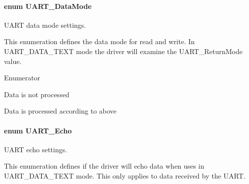 \paragraph[{U\+A\+R\+T\+\_\+\+Data\+Mode}]{\setlength{\rightskip}{0pt plus 5cm}enum {\bf U\+A\+R\+T\+\_\+\+Data\+Mode}}\label{_u_a_r_t_8h_a694090fdb166f94ac30b809f9cba87b8}


U\+A\+R\+T data mode settings. 

This enumeration defines the data mode for read and write. In U\+A\+R\+T\+\_\+\+D\+A\+T\+A\+\_\+\+T\+E\+X\+T mode the driver will examine the U\+A\+R\+T\+\_\+\+Return\+Mode value. \begin{Desc}
\item[Enumerator]\par
\begin{description}
\item[{\em 
U\+A\+R\+T\+\_\+\+D\+A\+T\+A\+\_\+\+B\+I\+N\+A\+R\+Y\label{_u_a_r_t_8h_a694090fdb166f94ac30b809f9cba87b8aaa8edcbf6c236b0d86491ea1e7c9e4d8}
}]Data is not processed \item[{\em 
U\+A\+R\+T\+\_\+\+D\+A\+T\+A\+\_\+\+T\+E\+X\+T\label{_u_a_r_t_8h_a694090fdb166f94ac30b809f9cba87b8a87fdfb7ca981eab7f56c51380fd7094e}
}]Data is processed according to above \end{description}
\end{Desc}
\paragraph[{U\+A\+R\+T\+\_\+\+Echo}]{\setlength{\rightskip}{0pt plus 5cm}enum {\bf U\+A\+R\+T\+\_\+\+Echo}}\label{_u_a_r_t_8h_aac6a03c2e1d76f53e1d9d923dcdc24f2}


U\+A\+R\+T echo settings. 

This enumeration defines if the driver will echo data when uses in U\+A\+R\+T\+\_\+\+D\+A\+T\+A\+\_\+\+T\+E\+X\+T mode. This only applies to data received by the U\+A\+R\+T.

